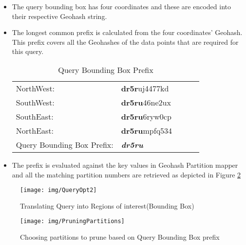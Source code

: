 \documentclass[article,type=msc,colorback,12pt,accentcolor=tud1d]{tudthesis}
\begin{document}
			\begin{itemize}
				\item The query bounding box has four coordinates and these are encoded into their respective Geohash string.
				\item The longest common prefix is calculated from the four coordinates' Geohash. This prefix covers all the Geohashes of the data points that are required for this query. 
				
					\begin{table}[h]
						\centering
						\begin{tabular}[htbp]{llllc}
						\\	\hline 
							NorthWest:           & \textbf{dr5r}uj4477kd       \\
							SouthWest:          & \textbf{dr5ru}46ne2ux       \\
							SouthEast:          & \textbf{dr5ru}6ryw0cp     \\ 
							NorthEast:          & \textbf{dr5ru}mpfq534     \\ \hline 
							Query Bounding Box Prefix: & \textit{\textbf{dr5ru}}\\
							\hline
						\end{tabular}
						\caption{Query Bounding Box Prefix}
						\label{tab:Query Bounding Box Prefix}
					\end{table}
				
				\item The prefix is evaluated against the key values in Geohash Partition mapper and all the matching partition numbers are retrieved as depicted in Figure \ref{fig:PruningPartitions}
			\end{itemize}
			
				\clearpage	
					\begin{figure}[p]
					\centering
					\texttt{[image: img/QueryOpt2]}
					\caption{Translating Query into Regions of interest(Bounding Box)}
					\label{fig:QueryOpt2}
					\end{figure}
				
			
					\begin{figure}[p]
						\centering
						\texttt{[image: img/PruningPartitions]}
						\caption{Choosing partitions to prune based on Query Bounding Box prefix}
						\label{fig:PruningPartitions}
					\end{figure}		
			
		\clearpage
\end{document}
